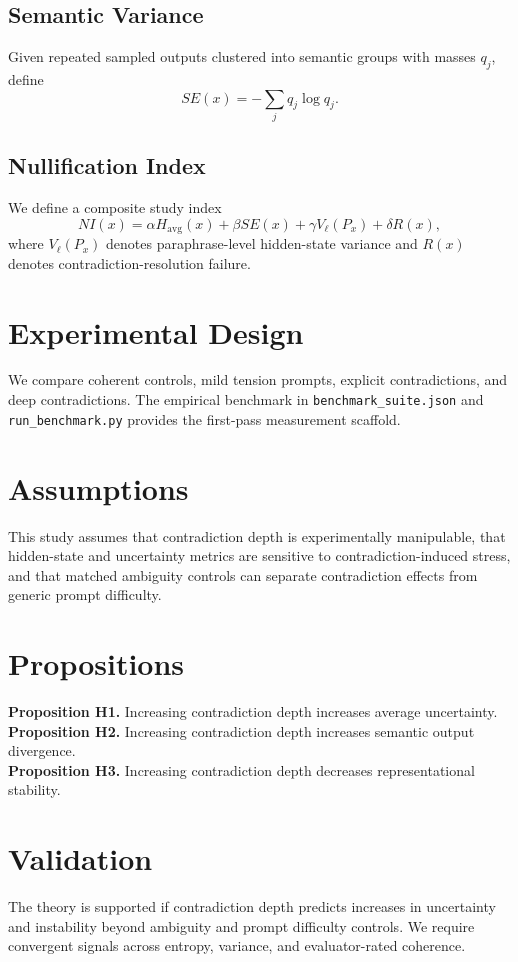 \documentclass[11pt]{article}
\begin{document}
\subsection{Semantic Variance}
Given repeated sampled outputs clustered into semantic groups with masses $q_j$, define
\[
SE(x) = -\sum_j q_j \log q_j.
\]

\subsection{Nullification Index}
We define a composite study index
\[
NI(x) = \alpha H_{\mathrm{avg}}(x) + \beta SE(x) + \gamma V_\ell(P_x) + \delta R(x),
\]
where $V_\ell(P_x)$ denotes paraphrase-level hidden-state variance and $R(x)$ denotes contradiction-resolution failure.

\section{Experimental Design}
We compare coherent controls, mild tension prompts, explicit contradictions, and deep contradictions. The empirical benchmark in \texttt{benchmark\_suite.json} and \texttt{run\_benchmark.py} provides the first-pass measurement scaffold.

\section{Assumptions}
This study assumes that contradiction depth is experimentally manipulable, that hidden-state and uncertainty metrics are sensitive to contradiction-induced stress, and that matched ambiguity controls can separate contradiction effects from generic prompt difficulty.

\section{Propositions}
\textbf{Proposition H1.} Increasing contradiction depth increases average uncertainty.\\
\textbf{Proposition H2.} Increasing contradiction depth increases semantic output divergence.\\
\textbf{Proposition H3.} Increasing contradiction depth decreases representational stability.

\section{Validation}
The theory is supported if contradiction depth predicts increases in uncertainty and instability beyond ambiguity and prompt difficulty controls. We require convergent signals across entropy, variance, and evaluator-rated coherence.
\end{document}

